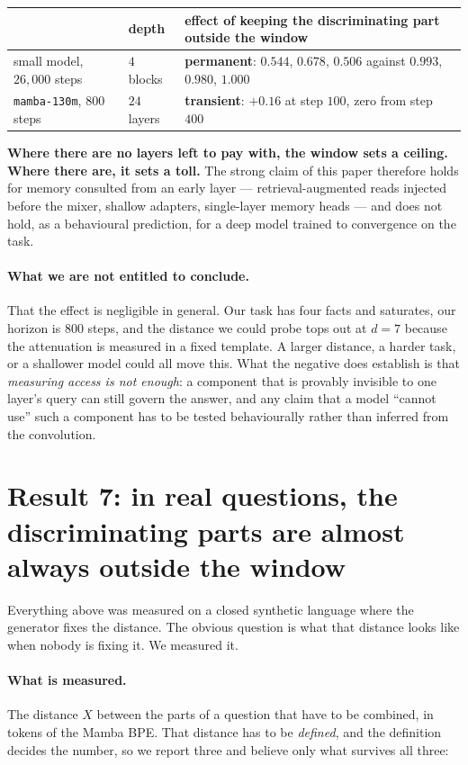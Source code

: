 \documentclass[10pt]{article}
\begin{document}
\begin{center}
\begin{tabular}{lll}
\toprule
& depth & effect of keeping the discriminating part outside the window \\
\midrule
small model, $26{,}000$ steps & $4$ blocks & \textbf{permanent}: $0.544$, $0.678$, $0.506$ against $0.993$, $0.980$, $1.000$ \\
\texttt{mamba-130m}, $800$ steps & $24$ layers & \textbf{transient}: $+0.16$ at step $100$, zero from step $400$ \\
\bottomrule
\end{tabular}
\end{center}

\textbf{Where there are no layers left to pay with, the window sets a ceiling. Where there are, it
sets a toll.} The strong claim of this paper therefore holds for memory consulted from an early layer
--- retrieval-augmented reads injected before the mixer, shallow adapters, single-layer memory heads
--- and does not hold, as a behavioural prediction, for a deep model trained to convergence on the
task.

\paragraph{What we are not entitled to conclude.} That the effect is negligible in general. Our task
has four facts and saturates, our horizon is $800$ steps, and the distance we could probe tops out at
$d{=}7$ because the attenuation is measured in a fixed template. A larger distance, a harder task, or
a shallower model could all move this. What the negative does establish is that \emph{measuring access
is not enough}: a component that is provably invisible to one layer's query can still govern the
answer, and any claim that a model ``cannot use'' such a component has to be tested behaviourally
rather than inferred from the convolution.

\section{Result 7: in real questions, the discriminating parts are almost always outside the window}

Everything above was measured on a closed synthetic language where the generator fixes the distance.
The obvious question is what that distance looks like when nobody is fixing it. We measured it.

\paragraph{What is measured.} The distance $X$ between the parts of a question that have to be
combined, in tokens of the Mamba BPE. That distance has to be \emph{defined}, and the definition
decides the number, so we report three and believe only what survives all three:
\end{document}
